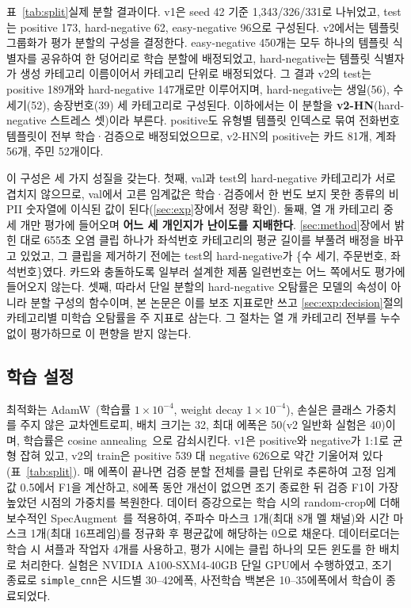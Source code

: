 \documentclass[11pt]{article}
\renewcommand{\emph}[1]{\textbf{#1}}
\begin{document}
표~\ref{tab:split}\는 실제 분할 결과이다. v1은 seed 42 기준 1{,}343/326/331로 나뉘었고,
test는 positive 173, hard-negative 62, easy-negative 96으로 구성된다. v2에서는 템플릿
그룹화가 평가 분할의 구성을 결정한다. easy-negative 450개는 모두 하나의 템플릿 식별자를
공유하여 한 덩어리로 학습 분할에 배정되었고, hard-negative는 템플릿 식별자가 생성 카테고리
이름이어서 카테고리 단위로 배정되었다. 그 결과 v2의 test는 positive 189개와 hard-negative
147개로만 이루어지며, hard-negative는 생일(56), 수 세기(52), 송장번호(39) 세 카테고리로
구성된다. 이하에서는 이 분할을 \textbf{v2-HN}(hard-negative 스트레스 셋)이라 부른다.
positive도 유형별 템플릿 인덱스로 묶여 전화번호 템플릿이 전부 학습·검증으로 배정되었으므로,
v2-HN의 positive는 카드 81개, 계좌 56개, 주민 52개이다.

이 구성은 세 가지 성질을 갖는다. 첫째, val과 test의 hard-negative 카테고리가 서로 겹치지
않으므로, val에서 고른 임계값은 학습·검증에서 한 번도 보지 못한 종류의 비PII 숫자열에
이식된 값이 된다(\ref{sec:exp}장에서 정량 확인). 둘째, 열 개 카테고리 중 세 개만 평가에
들어오며 \emph{어느 세 개인지가 난이도를 지배한다}. \ref{sec:method}장에서 밝힌 대로 655초
오염 클립 하나가 좌석번호 카테고리의 평균 길이를 부풀려 배정을 바꾸고 있었고, 그 클립을
제거하기 전에는 test의 hard-negative가 \{수 세기, 주문번호, 좌석번호\}였다. 카드와 충돌하도록
일부러 설계한 제품 일련번호는 어느 쪽에서도 평가에 들어오지 않는다. 셋째, 따라서 단일 분할의
hard-negative 오탐률은 모델의 속성이 아니라 분할 구성의 함수이며, 본 논문은 이를 보조 지표로만
쓰고 \ref{sec:exp:decision}절의 카테고리별 미학습 오탐률을 주 지표로 삼는다. 그 절차는 열 개
카테고리 전부를 누수 없이 평가하므로 이 편향을 받지 않는다.


\subsection{학습 설정}
최적화는 AdamW~\cite{loshchilov2019adamw}(학습률 $1\times10^{-4}$, weight decay
$1\times10^{-4}$), 손실은 클래스 가중치를 주지 않은 교차엔트로피, 배치 크기는 32, 최대 에폭은
50(v2 일반화 실험은 40)이며, 학습률은 cosine annealing~\cite{loshchilov2017sgdr}으로
감쇠시킨다. v1은 positive와 negative가 1:1로 균형 잡혀 있고, v2의 train은 positive 539 대
negative 626으로 약간 기울어져 있다(표~\ref{tab:split}). 매 에폭이 끝나면 검증 분할 전체를
클립 단위로 추론하여 고정 임계값 0.5에서 F1을 계산하고, 8에폭 동안 개선이 없으면 조기 종료한
뒤 검증 F1이 가장 높았던 시점의 가중치를 복원한다. 데이터 증강으로는 학습 시의 random-crop에
더해 보수적인 SpecAugment~\cite{park2019specaugment}를 적용하여, 주파수 마스크 1개(최대 8개
멜 채널)와 시간 마스크 1개(최대 16프레임)를 정규화 후 평균값에 해당하는 0으로 채운다.
데이터로더는 학습 시 셔플과 작업자 4개를 사용하고, 평가 시에는 클립 하나의 모든 윈도를 한
배치로 처리한다. 실험은 NVIDIA A100-SXM4-40GB 단일 GPU에서 수행하였고, 조기 종료로
\texttt{simple\_cnn}은 시드별 30--42에폭, 사전학습 백본은 10--35에폭에서 학습이 종료되었다.
\end{document}
